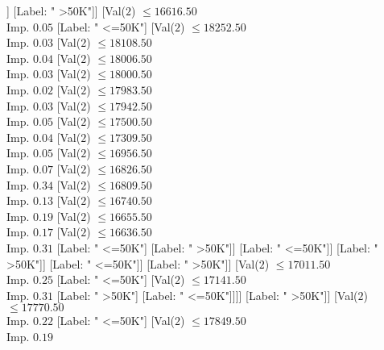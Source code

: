 \documentclass[margin=10pt]{standalone}
\begin{document}
\begin{forest}
																				[Label: " <=50K"]]
																			[Label: " >50K"]]
																		[Val($2$) $ \leq 16616.50$ \\ Imp. $0.05$
																			[Label: " <=50K"]
																			[Val($2$) $ \leq 18252.50$ \\ Imp. $0.03$
																				[Val($2$) $ \leq 18108.50$ \\ Imp. $0.04$
																					[Val($2$) $ \leq 18006.50$ \\ Imp. $0.03$
																						[Val($2$) $ \leq 18000.50$ \\ Imp. $0.02$
																							[Val($2$) $ \leq 17983.50$ \\ Imp. $0.03$
																								[Val($2$) $ \leq 17942.50$ \\ Imp. $0.05$
																									[Val($2$) $ \leq 17500.50$ \\ Imp. $0.04$
																										[Val($2$) $ \leq 17309.50$ \\ Imp. $0.05$
																											[Val($2$) $ \leq 16956.50$ \\ Imp. $0.07$
																												[Val($2$) $ \leq 16826.50$ \\ Imp. $0.34$
																													[Val($2$) $ \leq 16809.50$ \\ Imp. $0.13$
																														[Val($2$) $ \leq 16740.50$ \\ Imp. $0.19$
																															[Val($2$) $ \leq 16655.50$ \\ Imp. $0.17$
																																[Val($2$) $ \leq 16636.50$ \\ Imp. $0.31$
																																	[Label: " <=50K"]
																																	[Label: " >50K"]]
																																[Label: " <=50K"]]
																															[Label: " >50K"]]
																														[Label: " <=50K"]]
																													[Label: " >50K"]]
																												[Val($2$) $ \leq 17011.50$ \\ Imp. $0.25$
																													[Label: " <=50K"]
																													[Val($2$) $ \leq 17141.50$ \\ Imp. $0.31$
																														[Label: " >50K"]
																														[Label: " <=50K"]]]]
																											[Label: " >50K"]]
																										[Val($2$) $ \leq 17770.50$ \\ Imp. $0.22$
																											[Label: " <=50K"]
																											[Val($2$) $ \leq 17849.50$ \\ Imp. $0.19$

\end{forest}
\end{document}
